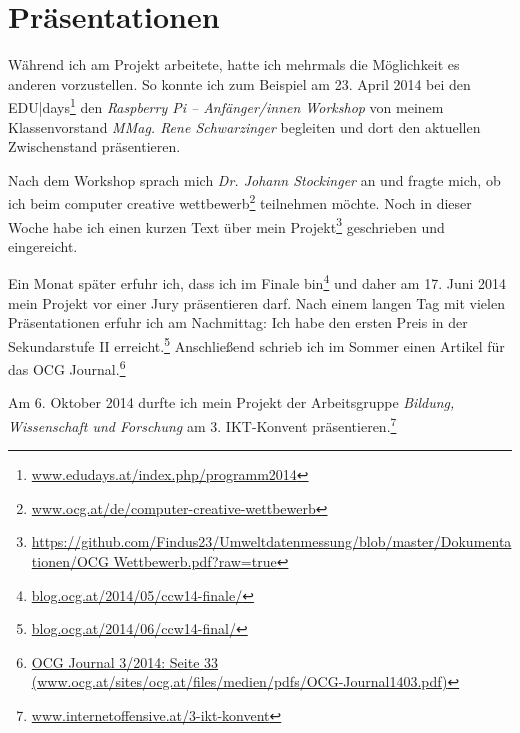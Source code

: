 \chapter{Präsentationen}

Während ich am Projekt arbeitete, hatte ich mehrmals die Möglichkeit es anderen vorzustellen. 
So konnte ich zum Beispiel am 23. April 2014 bei den \textsf{EDU|days}\footnote{\href{http://www.edudays.at/index.php/programm2014}{www.edudays.at/index.php/programm2014}} den \emph{Raspberry Pi -- Anfänger/innen Workshop} von meinem Klassenvorstand \emph{MMag. Rene Schwarzinger} begleiten und dort den aktuellen Zwischenstand präsentieren. 

Nach dem Workshop sprach mich \emph{Dr. Johann Stockinger} an und fragte mich, ob ich beim \textsf{computer creative wettbewerb}\footnote{\href{http://www.ocg.at/de/computer-creative-wettbewerb}{www.ocg.at/de/computer-creative-wettbewerb}}
teilnehmen möchte. Noch in dieser Woche habe ich einen kurzen Text über mein Projekt\footnote{\href{https://github.com/Findus23/Umweltdatenmessung/blob/master/Dokumentationen/OCG Wettbewerb.pdf?raw=true}{https://github.com/Findus23/Umweltdatenmessung/blob/master/Dokumentationen/OCG Wettbewerb.pdf?raw=true}}
geschrieben und eingereicht.

Ein Monat später erfuhr ich, dass ich im Finale bin\footnote{\href{http://blog.ocg.at/2014/05/ccw14-finale/}{blog.ocg.at/2014/05/ccw14-finale/}} und daher am 17. Juni 2014 mein Projekt vor einer Jury präsentieren darf. Nach einem langen Tag mit vielen Präsentationen erfuhr ich am Nachmittag: Ich habe den ersten Preis in der Sekundarstufe II erreicht.\footnote{\href{http://blog.ocg.at/2014/06/ccw14-final/}{blog.ocg.at/2014/06/ccw14-final/}}
Anschließend schrieb ich im Sommer einen Artikel für das OCG Journal.\footnote{\href{http://www.ocg.at/sites/ocg.at/files/medien/pdfs/OCG-Journal1403.pdf}{OCG Journal 3/2014: Seite 33 (www.ocg.at/sites/ocg.at/files/medien/pdfs/OCG-Journal1403.pdf)}}

Am 6. Oktober 2014 durfte ich mein Projekt der Arbeitsgruppe \textit{Bildung, Wissenschaft und Forschung} am \textsf{3. IKT-Konvent} präsentieren.\footnote{\href{http://www.internetoffensive.at/3-ikt-konvent}{www.internetoffensive.at/3-ikt-konvent}}

